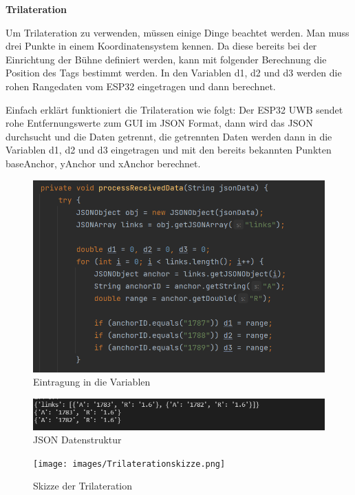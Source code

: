 \textbf{Trilateration}

Um Trilateration zu verwenden, müssen einige Dinge beachtet werden. Man muss drei Punkte in einem Koordinatensystem kennen. Da diese bereits bei der Einrichtung der Bühne definiert werden, kann mit folgender Berechnung die Position des Tags bestimmt werden. In den Variablen d1, d2 und d3 werden die rohen Rangedaten vom ESP32 eingetragen und dann berechnet.

Einfach erklärt funktioniert die Trilateration wie folgt: Der ESP32 UWB sendet rohe Entfernungswerte zum GUI im JSON Format, dann wird das JSON durchsucht und die Daten getrennt, die getrennten Daten werden dann in die Variablen d1, d2 und d3 eingetragen und mit den bereits bekannten Punkten baseAnchor, yAnchor und xAnchor berechnet.

\begin{figure}[H]
	\centering
	\includegraphics[width=0.9\linewidth]{images/EintragungVariablen.png}
	\caption[EintragungVariablen]{Eintragung in die Variablen}
	\label{fig:Variableneintragung}
\end{figure}

\begin{figure}[H]
	\centering
	\includegraphics[width=0.9\linewidth]{images/JSONData.png}
	\caption[JSONData]{JSON Datenstruktur}
	\label{fig:JSONData}
\end{figure}


\begin{figure}[H]
	\centering
	\texttt{[image: images/Trilaterationskizze.png]}
	\caption[Trilaterationskizze]{Skizze der Trilateration}
	\label{fig:Trilaterationskizze}
\end{figure}

